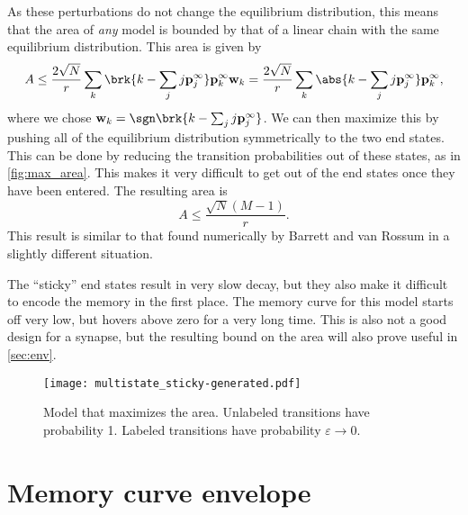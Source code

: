 \documentclass{article} %
\newcommand{\pr}{\mathbf{p}}
\newcommand{\eq}{\pr^\infty}
\newcommand{\w}{\mathbf{w}}
\begin{document}
As these perturbations do not change the equilibrium distribution, this means that the area of \emph{any} model is bounded by that of a linear chain with the same equilibrium distribution.
This area is given by
%
\begin{equation}\label{eq:multistatearea}
  A \leq \frac{2\sqrt{N}}{r} \sum_k \brk{k - \sum_j j\eq_j} \eq_k \w_k
    = \frac{2\sqrt{N}}{r} \sum_k \abs{k - \sum_j j\eq_j} \eq_k ,
\end{equation}
%
where we chose $\w_k=\sgn\brk{k - \sum_j j\eq_j}$.
We can then maximize this by pushing all of the equilibrium distribution symmetrically to the two end states.
This can be done by reducing the transition probabilities out of these states, as in \autoref{fig:max_area}.
This makes it very difficult to get out of the end states once they have been entered.
The resulting area is
%
\begin{equation}\label{eq:max_area}
  A \leq \frac{\sqrt{N}(M-1)}{r}.
\end{equation}
%
This result is similar to that found numerically by Barrett and van Rossum \cite{Barrett2008discrete} in a slightly different situation.

The ``sticky'' end states result in very slow decay, but they also make it difficult to encode the memory in the first place.
The memory curve for this model starts off very low, but hovers above zero for a very long time.
This is also not a good design for a synapse, but the resulting bound on the area will also prove useful in \autoref{sec:env}.


\begin{figure}[tbp]
 \begin{center}
  \texttt{[image: multistate\_sticky-generated.pdf]}
 \end{center}
  \caption{Model that maximizes the area.
  Unlabeled transitions have probability 1.
  Labeled transitions have probability $\varepsilon\to0$.
  }\label{fig:max_area}
\end{figure}



\section{Memory curve envelope}\label{sec:env}
\end{document}

